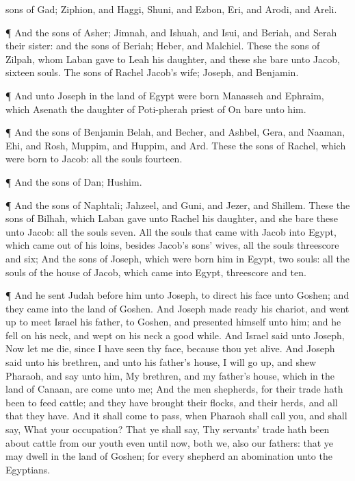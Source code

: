 {sons of
Gad;
Ziphion, and
Haggi,
Shuni, and
Ezbon,
Eri, and
Arodi, and
Areli.
\par }{\PP {}¶ And the
sons of
Asher;
Jimnah, and
Ishuah, and
Isui, and
Beriah, and
Serah their
sister: and the
sons of
Beriah;
Heber, and
Malchiel.
These
{} the
sons of
Zilpah, whom
Laban
gave to
Leah his
daughter, and these she
bare unto
Jacob,
{}
sixteen
souls.
The
sons of
Rachel
Jacob’s
wife;
Joseph, and
Benjamin.
\par }{\PP {}¶ And unto
Joseph in the
land of
Egypt were
born
Manasseh and
Ephraim, which
Asenath the
daughter of
Poti-pherah
priest of
On
bare unto him.
\par }{\PP {}¶ And the
sons of
Benjamin
{}
Belah, and
Becher, and
Ashbel,
Gera, and
Naaman,
Ehi, and
Rosh,
Muppim, and
Huppim, and
Ard.
These
{} the
sons of
Rachel, which were
born to
Jacob: all the
souls
{}
fourteen.
\par }{\PP {}¶ And the
sons of
Dan;
Hushim.
\par }{\PP {}¶ And the
sons of
Naphtali;
Jahzeel, and
Guni, and
Jezer, and
Shillem.
These
{} the
sons of
Bilhah, which
Laban
gave unto
Rachel his
daughter, and she
bare these unto
Jacob: all the
souls
{}
seven.
All the
souls that
came with
Jacob into
Egypt, which came
out of his
loins, besides
Jacob’s
sons’
wives, all the
souls
{}
threescore and
six;
And the
sons of
Joseph, which were
born him in
Egypt,
{}
two
souls: all the
souls of the
house of
Jacob, which
came into
Egypt,
{} threescore and
ten.
\par }{\PP {}¶ And he
sent
Judah before
him unto
Joseph, to
direct his
face unto
Goshen; and they
came into the
land of
Goshen.
And
Joseph made
ready his
chariot, and went
up to
meet
Israel his
father, to
Goshen, and
presented himself unto him; and he
fell on his
neck, and
wept on his
neck a good
while.
And
Israel
said unto
Joseph,
Now let me
die,
since I have
seen thy
face, because thou
{}
yet
alive.
And
Joseph
said unto his
brethren, and unto his
father’s
house, I will go
up, and
shew
Pharaoh, and
say unto him, My
brethren, and my
father’s
house, which
{} in the
land of
Canaan, are
come unto me;
And the
men
{}
shepherds, for their trade hath been to feed
cattle; and they have
brought their
flocks, and their
herds, and all that they have.
And it shall come to pass, when
Pharaoh shall
call you, and shall
say, What
{} your
occupation?
That ye shall
say, Thy
servants’
trade hath been about
cattle from our
youth even until now, both we,
{} also our
fathers: that ye may
dwell in the
land of
Goshen; for every
shepherd
{} an
abomination unto the
Egyptians.

}
